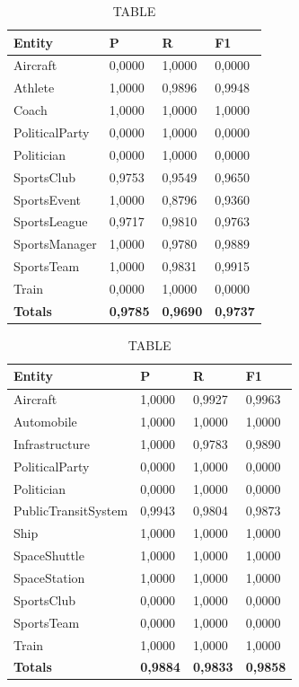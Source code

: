 \documentclass[thesis=M,english]{FITthesis}[2018/05/30]
\begin{document}
	\begin{table}[H]\centering
		\caption{TABLE}
		\label{}
		\begin{tabular}{|l|l|l|l|}
			\hline {\textbf{Entity}} & {\textbf{P}} & {\textbf{R}} & {\textbf{F1}}\\\hline
				Aircraft & 0,0000 & 1,0000 & 0,0000\\
				Athlete & 1,0000 & 0,9896 & 0,9948\\
				Coach & 1,0000 & 1,0000 & 1,0000\\
				PoliticalParty & 0,0000 & 1,0000 & 0,0000\\
				Politician & 0,0000 & 1,0000 & 0,0000\\
				SportsClub & 0,9753 & 0,9549 & 0,9650\\
				SportsEvent & 1,0000 & 0,8796 & 0,9360\\
				SportsLeague & 0,9717 & 0,9810 & 0,9763\\
				SportsManager & 1,0000 & 0,9780 & 0,9889\\				
				SportsTeam & 1,0000 & 0,9831 & 0,9915\\
				Train & 0,0000 & 1,0000 & 0,0000\\\hline
				\textbf{Totals} & \textbf{0,9785} & \textbf{0,9690} & \textbf{0,9737}\\\hline
		\end{tabular}
	\end{table}	

	\begin{table}[H]\centering
		\caption{TABLE}
		\label{}
		\begin{tabular}{|l|l|l|l|}
			\hline {\textbf{Entity}} & {\textbf{P}} & {\textbf{R}} & {\textbf{F1}}\\\hline
				Aircraft & 1,0000 & 0,9927 & 0,9963\\
				Automobile & 1,0000 & 1,0000 & 1,0000\\				
				Infrastructure & 1,0000 & 0,9783 & 0,9890\\
				PoliticalParty & 0,0000 & 1,0000 & 0,0000\\				
				Politician & 0,0000 & 1,0000 & 0,0000\\				
				PublicTransitSystem & 0,9943 & 0,9804 & 0,9873\\
				Ship & 1,0000 & 1,0000 & 1,0000\\				
				SpaceShuttle & 1,0000 & 1,0000 & 1,0000\\
				SpaceStation & 1,0000 & 1,0000 & 1,0000\\
				SportsClub & 0,0000 & 1,0000 & 0,0000\\
				SportsTeam & 0,0000 & 1,0000 & 0,0000\\
				Train & 1,0000 & 1,0000 & 1,0000\\\hline
				\textbf{Totals} & \textbf{0,9884} & \textbf{0,9833} & \textbf{0,9858}\\\hline
		\end{tabular}
	\end{table}		
	
\end{document}
